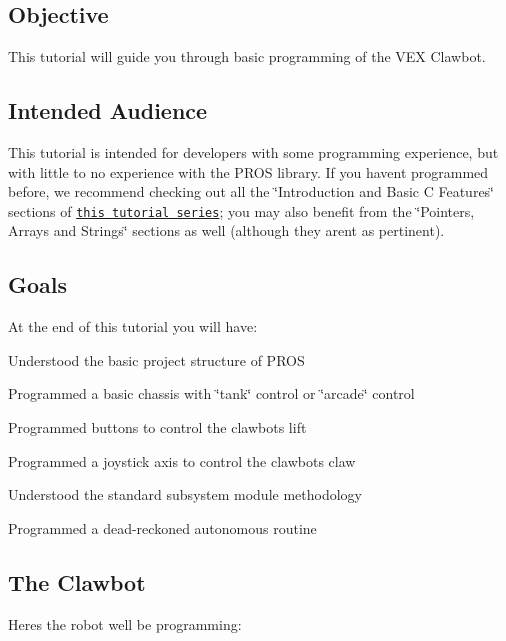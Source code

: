 \subsection*{Objective}

This tutorial will guide you through basic programming of the V\+EX Clawbot.

\subsection*{Intended Audience}

This tutorial is intended for developers with some programming experience, but with little to no experience with the P\+R\+OS library. If you haven\textquotesingle{}t programmed before, we recommend checking out all the \char`\"{}\+Introduction and Basic C Features\char`\"{} sections of \href{http://www.studytonight.com/c/overview-of-c.php}{\tt this tutorial series}; you may also benefit from the \char`\"{}\+Pointers, Arrays and Strings\char`\"{} sections as well (although they aren\textquotesingle{}t as pertinent).

\subsection*{Goals}

At the end of this tutorial you will have\+:


\begin{DoxyItemize}
\item Understood the basic project structure of P\+R\+OS
\item Programmed a basic chassis with \char`\"{}tank\char`\"{} control or \char`\"{}arcade\char`\"{} control
\item Programmed buttons to control the clawbot\textquotesingle{}s lift
\item Programmed a joystick axis to control the clawbot\textquotesingle{}s claw
\item Understood the standard subsystem module methodology
\item Programmed a dead-\/reckoned autonomous routine
\end{DoxyItemize}

\subsection*{The Clawbot}

Here\textquotesingle{}s the robot we\textquotesingle{}ll be programming\+:



